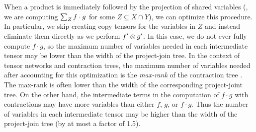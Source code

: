 When a product is immediately followed by the projection of shared variables (\ie, we are computing $\sum_Z f \cdot g$ for some $Z \subseteq X \cap Y$), we can optimize this procedure.
In particular, we skip creating copy tensors for the variables in $Z$ and instead eliminate them directly as we perform $f' \otimes g'$.
In this case, we do not ever fully compute $f \cdot g$, so the maximum number of variables needed in each intermediate tensor may be lower than the width of the project-join tree.
In the context of tensor networks and contraction trees, the maximum number of variables needed after accounting for this optimization is the \emph{max-rank} of the contraction tree \cite{kourtis2019fast,dudek2019efficient}.
The max-rank is often lower than the width of the corresponding project-joint tree.
On the other hand, the intermediate terms in the computation of $f \cdot g$ with contractions may have more variables than either $f$, $g$, or $f \cdot g$.
Thus the number of variables in each intermediate tensor may be higher than the width of the project-join tree (by at most a factor of 1.5).
